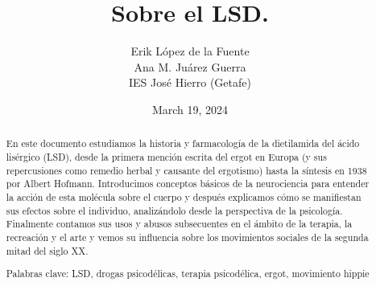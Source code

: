 \documentclass[a4paper, titlepage]{article}
\title{Sobre el LSD.}
\author{Erik López de la Fuente \\ Ana M. Juárez Guerra \\ IES José Hierro (Getafe)}
\date{March 19, 2024}
\begin{document}
\maketitle

\begin{abstract}
En este documento estudiamos la historia y farmacología de la dietilamida del ácido lisérgico (LSD), desde la primera mención escrita del ergot en Europa (y sus repercusiones como remedio herbal y causante del ergotismo) hasta la síntesis en 1938 por Albert Hofmann. Introducimos conceptos básicos de la neurociencia para entender la acción de esta molécula sobre el cuerpo y después explicamos cómo se manifiestan sus efectos sobre el individuo, analizándolo desde la perspectiva de la psicología. Finalmente contamos sus usos y abusos subsecuentes en el ámbito de la terapia, la recreación y el arte y vemos su influencia sobre los movimientos sociales de la segunda mitad del siglo XX.

Palabras clave: LSD, drogas psicodélicas, terapia psicodélica, ergot, movimiento hippie
\end{abstract}



\tableofcontents

\newpage









\nocite{*}


\end{document}
